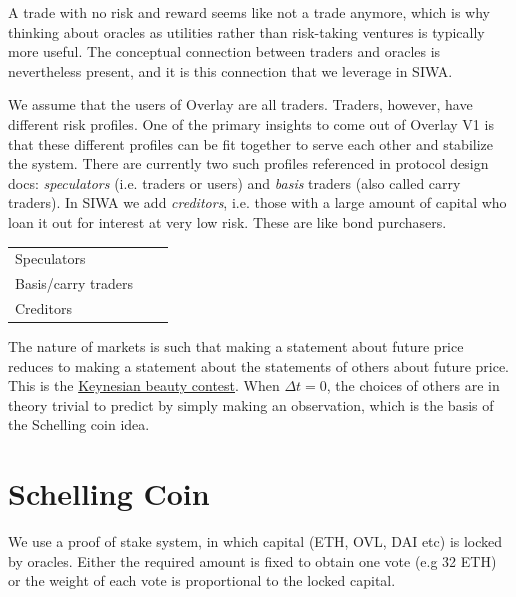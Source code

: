 \documentclass[11pt]{article}
\begin{document}
A trade with no risk and reward seems like not a trade anymore, which is why thinking about oracles as utilities rather than risk-taking ventures is typically more useful. The conceptual connection between traders and oracles is nevertheless present, and it is this connection that we leverage in SIWA. 

We assume that the users of Overlay are all traders. Traders, however, have different risk profiles. One of the primary insights to come out of Overlay V1 is that these different profiles can be fit together to serve each other and stabilize the system. There are currently two such profiles referenced in protocol design docs: {\it speculators} (i.e. traders or users) and {\it basis} traders (also called carry  traders). In SIWA we  add {\it  creditors}, i.e. those with a large amount of capital who loan it out for interest at very low risk. These are like bond purchasers. 


\begin{center}
\begin{tabular}{|l|c|c|}
	\hline
Speculators & & \\
Basis/carry traders & & \\
Creditors & & \\
\hline
\end{tabular}
\end{center}


 The nature of markets is such that making a statement about future price reduces to making a statement about the statements of others about future price. This is the \href{https://en.wikipedia.org/wiki/Keynesian_beauty_contest}{Keynesian beauty contest}. When $\Delta t = 0$, the choices of others are in theory trivial to predict by simply making an observation, which is the basis of the Schelling coin idea.



 \section{Schelling Coin}

 We use a proof of stake system, in which capital (ETH, OVL, DAI etc) is locked by oracles. Either the required amount is fixed to obtain one vote (e.g 32 ETH) or  the weight of each vote is proportional to the locked capital. 
\end{document}
